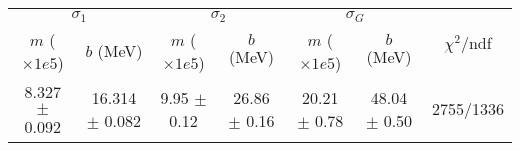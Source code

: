 \begin{tabular}{cc|cc|cc||c}
\multicolumn{2}{c|}{$\sigma_1$} & \multicolumn{2}{|c}{$\sigma_2$} & \multicolumn{2}{|c}{$\sigma_G$}  & \multirow{2}{*}{$\chi^2/$ndf}\\
$m$ ($\times1e5$) & $b$ (MeV) & $m$ ($\times1e5$) & $b$ (MeV) & $m$ ($\times1e5$) & $b$ (MeV) & \\
\hline
8.327 $\pm$ 0.092 & 16.314 $\pm$ 0.082 & 9.95 $\pm$ 0.12 & 26.86 $\pm$ 0.16 & 20.21 $\pm$ 0.78 & 48.04 $\pm$ 0.50 & 2755/1336\\
\end{tabular}
